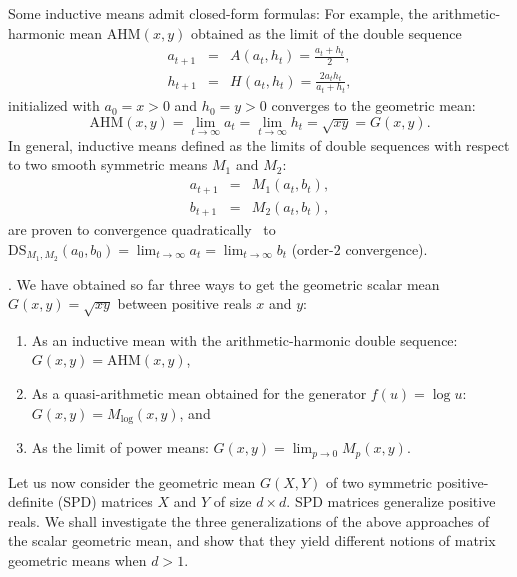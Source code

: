 \documentclass{article}
\def\AHM{\mathrm{AHM}}
\def\DS{\mathrm{DS}}
\begin{document}
Some inductive means admit closed-form formulas: For example, the arithmetic-harmonic mean $\AHM(x,y)$ obtained as the limit of the double sequence
\begin{eqnarray*}
a_{t+1} &=& A(a_t,h_t)=\frac{a_t+h_t}{2},\\
h_{t+1} &=& H(a_t,h_t)=\frac{2a_th_t}{a_t+h_t},
\end{eqnarray*}
initialized with $a_0=x>0$ and $h_0=y>0$
converges to the geometric mean: 
$$
\AHM(x,y)=\lim_{t\rightarrow\infty} a_t=\lim_{t\rightarrow\infty} h_t=\sqrt{xy}=G(x,y).
$$
In general, inductive means defined as the limits of double sequences with respect to two smooth symmetric means $M_1$ and $M_2$:
\begin{eqnarray*}
a_{t+1} &=& M_1(a_t,b_t),\\
b_{t+1} &=& M_2(a_t,b_t),
\end{eqnarray*}
are proven to convergence quadratically~\cite{ArchimedeanDoubleSequence-1984} to $\DS_{M_1,M_2}(a_0,b_0)=\lim_{t\rightarrow \infty} a_t=\lim_{t\rightarrow \infty} b_t$ (order-$2$ convergence).


\vskip 0.3cm
.
We have obtained so far three ways to get the geometric scalar mean $G(x,y)=\sqrt{xy}$ between positive reals $x$ and $y$:
\begin{enumerate}
	\item As an inductive mean with the arithmetic-harmonic double sequence: $G(x,y)=\AHM(x,y)$,
		\item As a quasi-arithmetic mean obtained for the generator $f(u)=\log u$: $G(x,y)=M_{\log}(x,y)$, and
	\item As the limit of power means: $G(x,y)=\lim_{p\rightarrow 0} M_p(x,y)$.
\end{enumerate}

Let us now consider the geometric mean $G(X,Y)$ of two symmetric positive-definite (SPD) matrices $X$ and $Y$ of size $d\times d$.
SPD matrices generalize positive reals.
We shall investigate the three generalizations of the above approaches of the scalar geometric mean, and show that they yield different notions of matrix geometric means when $d>1$. 
\end{document}
